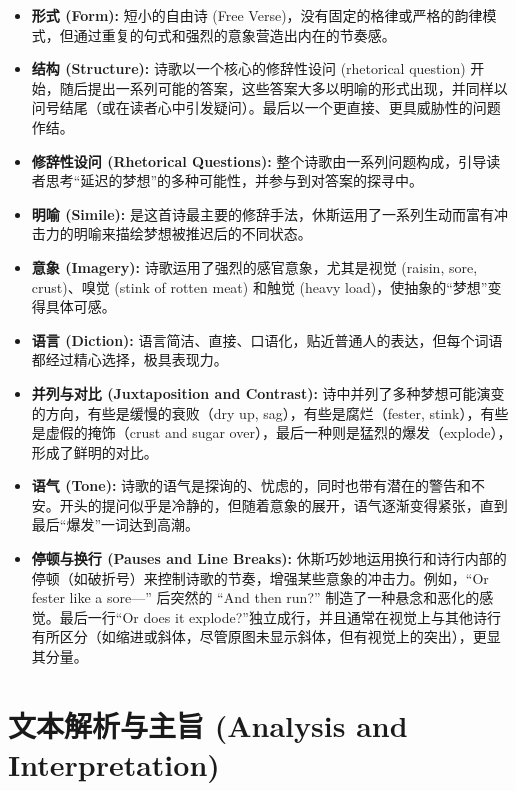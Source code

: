 \documentclass[12pt, a4paper]{article}
\begin{document}
\begin{itemize}
    \item \textbf{形式 (Form):} 短小的自由诗 (Free Verse)，没有固定的格律或严格的韵律模式，但通过重复的句式和强烈的意象营造出内在的节奏感。
    \item \textbf{结构 (Structure):} 诗歌以一个核心的修辞性设问 (rhetorical question) 开始，随后提出一系列可能的答案，这些答案大多以明喻的形式出现，并同样以问号结尾（或在读者心中引发疑问）。最后以一个更直接、更具威胁性的问题作结。
    \item \textbf{修辞性设问 (Rhetorical Questions):} 整个诗歌由一系列问题构成，引导读者思考“延迟的梦想”的多种可能性，并参与到对答案的探寻中。
    \item \textbf{明喻 (Simile):} 是这首诗最主要的修辞手法，休斯运用了一系列生动而富有冲击力的明喻来描绘梦想被推迟后的不同状态。
    \item \textbf{意象 (Imagery):} 诗歌运用了强烈的感官意象，尤其是视觉 (raisin, sore, crust)、嗅觉 (stink of rotten meat) 和触觉 (heavy load)，使抽象的“梦想”变得具体可感。
    \item \textbf{语言 (Diction):} 语言简洁、直接、口语化，贴近普通人的表达，但每个词语都经过精心选择，极具表现力。
    \item \textbf{并列与对比 (Juxtaposition and Contrast):} 诗中并列了多种梦想可能演变的方向，有些是缓慢的衰败（dry up, sag），有些是腐烂（fester, stink），有些是虚假的掩饰（crust and sugar over），最后一种则是猛烈的爆发（explode），形成了鲜明的对比。
    \item \textbf{语气 (Tone):} 诗歌的语气是探询的、忧虑的，同时也带有潜在的警告和不安。开头的提问似乎是冷静的，但随着意象的展开，语气逐渐变得紧张，直到最后“爆发”一词达到高潮。
    \item \textbf{停顿与换行 (Pauses and Line Breaks):} 休斯巧妙地运用换行和诗行内部的停顿（如破折号）来控制诗歌的节奏，增强某些意象的冲击力。例如，“Or fester like a sore—” 后突然的 “And then run?” 制造了一种悬念和恶化的感觉。最后一行“Or does it explode?”独立成行，并且通常在视觉上与其他诗行有所区分（如缩进或斜体，尽管原图未显示斜体，但有视觉上的突出），更显其分量。
\end{itemize}

\section{文本解析与主旨 (Analysis and Interpretation)}
\end{document}
